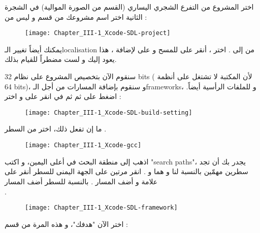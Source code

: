 اختر المشروع من التفرع الشجري اليساري (القسم
من الصورة الموالية) في الشجرة الثانية اختر اسم مشروعك من قسم 
و ليس من
 :

\begin{figure}[H]
	\centering
	\texttt{[image: Chapter\_III-1\_Xcode-SDL-project]}
\end{figure}

يمكنك أيضاً تغيير الـ\textenglish{localisation}
من 
إلى 
.
اختر 
،
أنقر على
\InlineCode{-}
للمسح و على 
\InlineCode{+}
لإضافة 
،
هذا يعود إليك و لست مضطراً للقيام بذلك.

سنقوم الآن بتخصيص المشروع على نظام
\textenglish{32 bits}
( لأن المكتبة لا تشتغل على أنظمة
\textenglish{64 bits})،
و سنقوم بإضافة المسارات من أجل الـ\textenglish{frameworks}،
و للملفات الرأسية أيضاً. اضغط على
ثم 
ثم في 
انقر على
 و اختر
 :

\begin{figure}[H]
	\centering
	\texttt{[image: Chapter\_III-1\_Xcode-SDL-build-setting]}
\end{figure}


ما إن تفعل ذلك، اختر
من السطر
.

\begin{figure}[H]
	\centering
	\texttt{[image: Chapter\_III-1\_Xcode-gcc]}
\end{figure}

اذهب إلى منطقة البحث في أعلى اليمين، و اكتب
"\textenglish{search paths}"،
يجدر بك أن تجد سطرين مهمّين بالنسبة لنا و هما
و 
.
انقر مرتين على الجهة اليمنى للسطر 
أنقر على علامة
\InlineCode{+}
 و أضف المسار
.
بالنسبة للسطر 
أضف المسار\\
.

\begin{figure}[H]
	\centering
	\texttt{[image: Chapter\_III-1\_Xcode-SDL-framework]}
\end{figure}

اختر الآن "هدفك"، و هذه المرة من قسم 
 :

